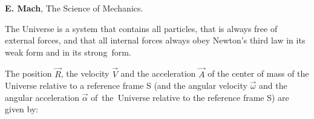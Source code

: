 \documentclass[10pt]{article}
\begin{document}
\par \bigskip\smallskip \noindent \textbf{E. Mach}, The Science of Mechanics.

\newpage

\par {}

\par {}\hypertarget{p1a1}{}

\par \bigskip \noindent The Universe is a system that contains all particles, that is always free of external forces, and that all internal forces always obey Newton's third law in its weak form and in its \hbox {strong form}.

\par \bigskip \noindent The position ${\vec{\mathit{R}}}$, the velocity ${\vec{\mathit{V}}}$ and the acceleration ${\vec{\mathit{A}}}$ of the center of mass of the Universe relative to a reference frame S (and the angular velocity ${\vec{\omega}}$ and the angular acceleration ${\vec{\alpha}}$ \hbox {of the Universe} relative to the reference frame S) are given by:
\end{document}
